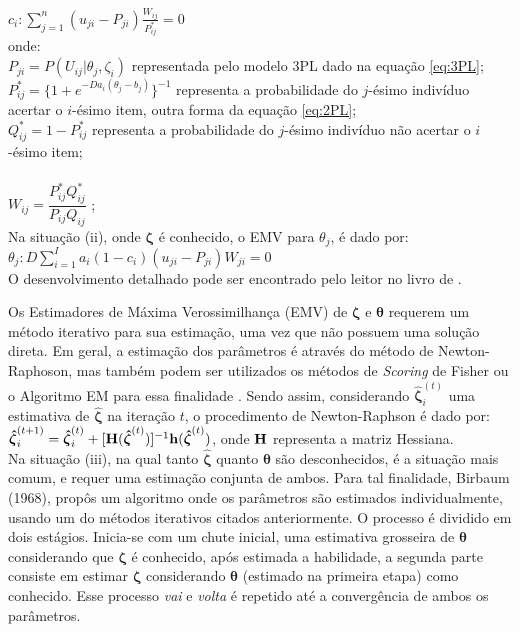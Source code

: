 \noindent $ 
	c_i: \sum_{j=1}^{n}(u_{ji} - P_{ji})\frac{W_{ij}}{P^*_{ij}} = 0
$\\

\noindent onde:\\

\noindent $P_{ji} = P(U_{ij}|\theta_j,\zeta_i)$ representada pelo modelo 3PL dado na equação \ref{eq:3PL};\\

\noindent $P^*_{ij} = \{1 + e^{-Da_i(\theta_j - b_j)}\}^{-1} $ representa a probabilidade do $j$-ésimo indivíduo acertar o $i$-ésimo item, outra forma da equação \ref{eq:2PL};\\

\noindent $Q^*_{ij} = 1 - P^*_{ij} $ representa a probabilidade do $j$-ésimo indivíduo não acertar o $i$-ésimo item;\\
\\
\noindent $W_{ij} = \dfrac{P^*_{ij}Q^*_{ij}}{P_{ij}Q_{ij}} $ ;\\

Na situação (ii), onde $\boldsymbol{\zeta}$ é conhecido, o EMV para $ \theta_j $,  é dado por:\\


\noindent $ \theta_j : D\sum_{i=1}^{I}{a_i(1-c_i)(u_{ji}-P_{ji})W_{ji}} = 0 $\\

O desenvolvimento detalhado pode ser encontrado pelo leitor no livro de .

Os Estimadores de Máxima Verossimilhança (EMV) de $ \boldsymbol{\zeta} $ e $ \boldsymbol{\theta} $ requerem um método iterativo para sua estimação, uma vez que não possuem uma solução direta. Em geral, a estimação dos parâmetros é através do método de Newton-Raphoson, mas também podem ser utilizados os métodos de \textit{Scoring} de Fisher ou o Algoritmo EM para essa finalidade . Sendo assim, considerando $\boldsymbol{\hat{\zeta}}^{(t)}_{i}$
uma estimativa de $\boldsymbol{\hat{\zeta}}$ na iteração $t$, o procedimento de
 Newton-Raphson é dado por:\\

\noindent $ \boldsymbol{\hat{\zeta}}^{(t+1)}_{i} = \boldsymbol{\hat{\zeta}}^{(t)}_{i} + [\bold{H}(\boldsymbol{\hat{\zeta}}^{(t)})]^{-1}\bold{h}({\boldsymbol{\hat{\zeta}}^{(t)}})
$, onde $\bold{H}$ representa a matriz Hessiana.\\

Na situação (iii), na qual tanto $ \boldsymbol{\hat{\zeta}} $ quanto $ \boldsymbol{\theta} $ são desconhecidos, é a situação mais comum, e requer uma estimação conjunta de ambos.
Para tal finalidade, Birbaum (1968), propôs um algoritmo onde os parâmetros são estimados individualmente, usando um do métodos iterativos citados anteriormente.
O processo é dividido em dois estágios. Inicia-se com um chute inicial, uma estimativa grosseira de $ \boldsymbol{\theta} $ considerando que $ \boldsymbol{\zeta} $ é conhecido, após estimada a habilidade, a segunda parte consiste em estimar $ \boldsymbol{\zeta} $ considerando $ \boldsymbol{\theta} $ (estimado na primeira etapa) como conhecido. Esse processo \textit{vai} e \textit{volta} é repetido até a convergência de ambos os parâmetros.




